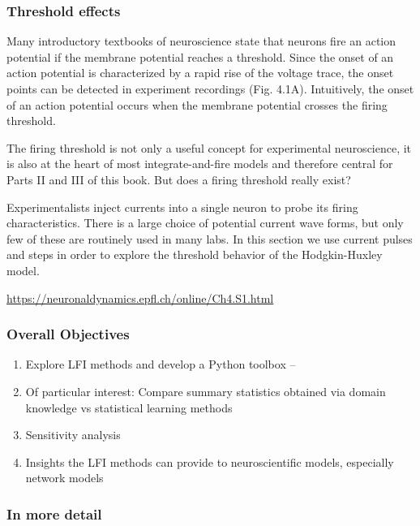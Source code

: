 \subsubsection{Threshold effects}
Many introductory textbooks of neuroscience state that neurons fire an action potential if the membrane potential reaches a threshold. Since the onset of an action potential is characterized by a rapid rise of the voltage trace, the onset points can be detected in experiment recordings (Fig. 4.1A). Intuitively, the onset of an action potential occurs when the membrane potential crosses the firing threshold.

The firing threshold is not only a useful concept for experimental neuroscience, it is also at the heart of most integrate-and-fire models and therefore central for Parts II and III of this book. But does a firing threshold really exist?

Experimentalists inject currents into a single neuron to probe its firing characteristics. There is a large choice of potential current wave forms, but only few of these are routinely used in many labs. In this section we use current pulses and steps in order to explore the threshold behavior of the Hodgkin-Huxley model.

\url{https://neuronaldynamics.epfl.ch/online/Ch4.S1.html}

\subsubsection{Overall Objectives} 

\begin{enumerate}
    \item Explore LFI methods and develop a Python toolbox -- 
    \item Of particular interest: Compare summary statistics obtained via domain knowledge vs statistical learning methods
    \item Sensitivity analysis
    \item Insights the LFI methods can provide to neuroscientific models, especially network models
\end{enumerate}

\subsubsection{In more detail} 

